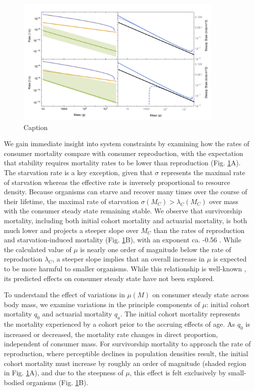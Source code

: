 \documentclass[11pt]{article}
\begin{document}
\begin{figure}[h!]
    \centering
    \includegraphics[width=0.9\textwidth]{joined_survivorship.pdf}
    \caption{
    \footnotesize
    Caption}
    \label{fig:naturalmort}
\end{figure}



We gain immediate insight into system constraints by examining how the rates of consumer mortality compare with consumer reproduction, with the expectation that stability requires mortality rates to be lower than reproduction (Fig. \ref{fig:naturalmort}A).
The starvation rate is a key exception, given that $\sigma$ represents the maximal rate of starvation whereas the effective rate is inversely proportional to resource density.
Because organisms can starve and recover many times over the course of their lifetime, the maximal rate of starvation $\sigma(M_C) > \lambda_C(M_C)$ over mass with the consumer steady state remaining stable.
We observe that survivorship mortality, including both initial cohort mortality and actuarial mortality, is both much lower and projects a steeper slope over $M_C$ than the rates of reproduction and starvation-induced mortality (Fig. \ref{fig:naturalmort}B), with an exponent ca. -0.56 \citep[cf.][]{jones2008senescence}.
While the calculated value of $\mu$ is nearly one order of magnitude below the rate of reproduction $\lambda_C$, a steeper slope implies that an overall increase in $\mu$ is expected to be more harmful to smaller organisms. 
While this relationship is well-known \citep{CalderIII:1983jd}, its predicted effects on consumer steady state have not been explored.


To understand the effect of variations in $\mu(M)$ on consumer steady state across body mass, we examine variations in the principle components of $\mu$: initial cohort mortality $q_0$ and actuarial mortality $q_a$.
The initial cohort mortality represents the mortality experienced by a cohort prior to the accruing effects of age. 
As $q_0$ is increased or decreased, the mortality rate changes in direct proportion, independent of consumer mass.
For survivorship mortality to approach the rate of reproduction, where perceptible declines in population densities result, the initial cohort mortality must increase by roughly an order of magnitude (shaded region in Fig. \ref{fig:naturalmort}A), and due to the steepness of $\mu$, this effect is felt exclusively by small-bodied organisms (Fig. \ref{fig:naturalmort}B).
\end{document}
